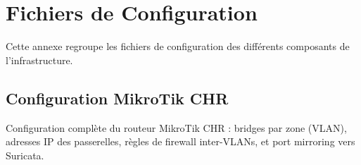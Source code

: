 \chapter{Fichiers de Configuration}
\label{annexe:configs}

Cette annexe regroupe les fichiers de configuration des différents composants de l'infrastructure.

\section{Configuration MikroTik CHR}
\label{sec:config_mikrotik}

Configuration complète du routeur MikroTik CHR : bridges par zone (VLAN), adresses IP des passerelles, règles de firewall inter-VLANs, et port mirroring vers Suricata.

